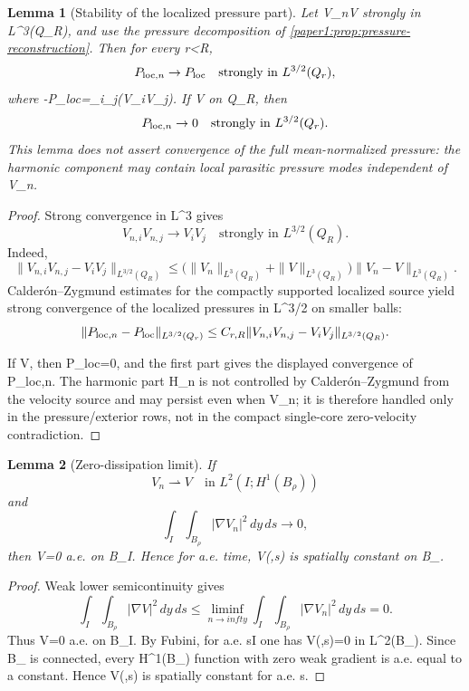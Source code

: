 \documentclass[11pt]{amsart}
\def\({}%
\def\){}%
\def\infty{infty}%
\theoremstyle{plain}
\newtheorem{lemma}[lemma]{Lemma}
\theoremstyle{definition}
\theoremstyle{remark}
\begin{document}
\begin{lemma}[Stability of the localized pressure part]\label{paper1:lem:pressure-stability}
Let \(V_n\to V\) strongly in \(L^3(Q_R)\), and use the pressure decomposition
of \cref{paper1:prop:pressure-reconstruction}.  Then for every \(r<R\),
\[
  P_{{\rm loc},n}\to P_{\rm loc}
  \quad\text{strongly in }L^{3/2}(Q_r),
\]
where \(-\Delta P_{\rm loc}=\partial_i\partial_j(\zeta V_iV_j)\).  If
\(V\) on \(Q_R\), then
\[
  P_{{\rm loc},n}\to0
  \quad\text{strongly in }L^{3/2}(Q_r).
\]
This lemma does not assert convergence of the full mean-normalized pressure:
the harmonic component may contain local parasitic pressure modes independent
of \(V_n\).
\end{lemma}

\begin{proof}
Strong convergence in \(L^3\) gives
\[
  V_{n,i}V_{n,j}\to V_iV_j
  \quad\text{strongly in }L^{3/2}(Q_R).
\]
Indeed,
\[
  \|V_{n,i}V_{n,j}-V_iV_j\|_{L^{3/2}(Q_R)}
  \le
  \bigl(\|V_n\|_{L^3(Q_R)}+\|V\|_{L^3(Q_R)}\bigr)
  \|V_n-V\|_{L^3(Q_R)}.
\]
Calder\'on--Zygmund estimates for the compactly supported localized source yield
strong convergence of the localized pressures in \(L^{3/2}\) on smaller balls:
\[
  \|P_{{\rm loc},n}-P_{\rm loc}\|_{L^{3/2}(Q_r)}
  \le
  C_{r,R}
  \|V_{n,i}V_{n,j}-V_iV_j\|_{L^{3/2}(Q_R)}.
\]

If \(V\), then \(P_{\rm loc}=0\), and the first part gives the displayed
convergence of \(P_{{\rm loc},n}\). The harmonic part \(H_n\) is not controlled
by Calder\'on--Zygmund from the velocity source and may persist even when
\(V_n\); it is therefore handled only in the pressure/exterior rows, not in
the compact single-core zero-velocity contradiction.
\end{proof}

\begin{lemma}[Zero-dissipation limit]\label{paper1:lem:zero-dissipation}
If
\[
  V_n\rightharpoonup V\quad\text{in }L^2(I;H^1(B_\rho))
\]
and
\[
  \int_I\int_{B_\rho}|\nabla V_n|^2\,dy\,ds\to0,
\]
then \(\nabla V=0\) a.e. on \(B_\rho\times I\).  Hence for a.e. time,
\(V(\cdot,s)\) is spatially constant on \(B_\rho\).
\end{lemma}

\begin{proof}
Weak lower semicontinuity gives
\[
  \int_I\int_{B_\rho}|\nabla V|^2\,dy\,ds
  \le \liminf_{n\to\infty}\int_I\int_{B_\rho}|\nabla V_n|^2\,dy\,ds=0.
\]
Thus \(\nabla V=0\) a.e. on \(B_\rho\times I\).  By Fubini, for a.e.
\(s\in I\) one has \(\nabla V(\cdot,s)=0\) in \(L^2(B_\rho)\).  Since
\(B_\rho\) is connected, every \(H^1(B_\rho)\) function with zero weak
gradient is a.e. equal to a constant.  Hence \(V(\cdot,s)\) is spatially
constant for a.e. \(s\).
\end{proof}
\end{document}
